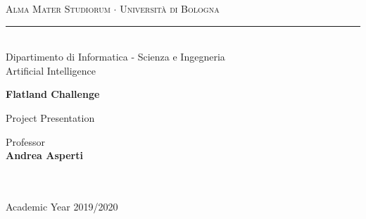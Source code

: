 \documentclass[12pt, a4paper, hidelinks]{article}
\begin{document}
\begin{titlepage}

\begin{center}
{{\Large{\textsc{Alma Mater Studiorum $\cdot$ Universit\`a di Bologna}}}}
\rule[0.1cm]{15.8cm}{0.25mm}
\\\vspace{3mm}
%
%
{\Large{Dipartimento di Informatica - Scienza e Ingegneria\\
Artificial Intelligence}}


\end{center}

\vspace{20mm}

\begin{center}{
%
%
	{\LARGE{\textbf{Flatland Challenge}}}}
\end{center}

\vspace{15mm}

{\begin{center}
	 \large{Project Presentation}
\end{center}}

\vspace{32mm} \par \noindent

\begin{minipage}[t]{0.47\textwidth}
%
%
{\large{ Professor \vspace{2mm}\\{\textbf{Andrea Asperti}
}\\\\\\}}
\end{minipage}
%
\hfill
%
\begin{minipage}[t]{0.47\textwidth}
\end{minipage}

\vspace{31mm}

\begin{center}
Academic Year {2019/2020}
\end{center}

\end{titlepage}

{\tableofcontents}
\thispagestyle{empty}

\newpage
\setcounter{page}{1}
\end{document}
